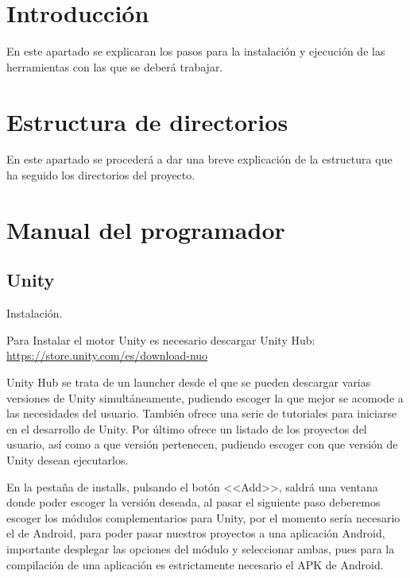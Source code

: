 
\section{Introducción}
En este apartado se explicaran los pasos para la instalación y ejecución de las herramientas con las que se deberá trabajar.

\section{Estructura de directorios}
En este apartado se procederá a dar una breve explicación de la estructura que ha seguido los directorios del proyecto.\\




\section{Manual del programador}
\subsection{Unity}
Instalación.

Para Instalar el motor Unity es necesario descargar Unity Hub: \url{https://store.unity.com/es/download-nuo}

Unity Hub se trata de un launcher desde el que se pueden descargar varias versiones de Unity simultáneamente, pudiendo escoger la que mejor se acomode a las necesidades del usuario. También ofrece una serie de tutoriales para iniciarse en el desarrollo de Unity. Por último ofrece un listado de los proyectos del usuario, así como a que versión pertenecen, pudiendo escoger con que versión de Unity desean ejecutarlos.

En la pestaña de installs, pulsando el botón <<Add>>, saldrá una ventana donde poder escoger la versión deseada, al pasar el siguiente paso deberemos escoger los módulos complementarios para Unity, por el momento sería necesario el de Android, para poder pasar nuestros proyectos a una aplicación Android, importante desplegar las opciones del módulo y seleccionar ambas, pues para la compilación de una aplicación es estrictamente necesario el APK de Android.

